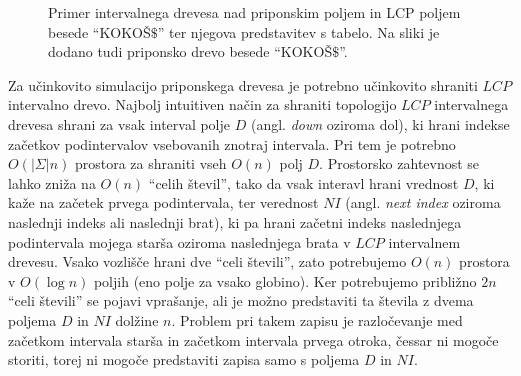 \begin{figure}[tb]
    \begin{subfigure}[T]{0.45\linewidth}        
        
        \centering
        \subcaption*{}
        \label{fig:aSADrevo}
    \end{subfigure}
    \hfill
    \begin{subfigure}[T]{0.45\linewidth}        
        
        \centering
        \subcaption*{}
        \label{fig:aSAPolje}
    \end{subfigure}
   
    \caption{Primer intervalnega drevesa nad priponskim poljem in LCP poljem besede \enquote{KOKOŠ$\$$} ter njegova predstavitev s tabelo. Na sliki je dodano tudi priponsko drevo besede \enquote{KOKOŠ$\$$}.} 
    \label{fig:intervalTree}
\end{figure}

Za učinkovito simulacijo priponskega drevesa je potrebno učinkovito shraniti $LCP$ intervalno drevo. Najbolj intuitiven način za shraniti topologijo $LCP$ intervalnega drevesa shrani za vsak interval polje $D$ (angl. \textit{down} oziroma dol), ki hrani indekse začetkov podintervalov vsebovanih znotraj intervala. Pri tem je potrebno $O(|\Sigma|n)$ prostora za shraniti vseh $O(n)$ polj $D$. Prostorsko zahtevnost se lahko zniža na $O(n)$ \enquote{celih števil}, tako da vsak interavl hrani vrednost $D$, ki kaže na začetek prvega podintervala, ter verednost $NI$ (angl. \textit{next index} oziroma naslednji indeks ali naslednji brat), ki pa hrani začetni indeks naslednjega podintervala mojega starša oziroma naslednjega brata v $LCP$ intervalnem drevesu. Vsako vozlišče hrani dve \enquote{celi števili}, zato potrebujemo $O(n)$ prostora v $O(\log{n})$ poljih (eno polje za vsako globino). Ker potrebujemo približno $2n$ \enquote{celi števili} se pojavi vprašanje, ali je možno predstaviti ta števila z dvema poljema $D$ in $NI$ dolžine $n$. Problem pri takem zapisu je razločevanje med začetkom intervala starša in začetkom intervala prvega otroka, čessar ni mogoče storiti, torej ni mogoče predstaviti zapisa samo s poljema $D$ in $NI$.

